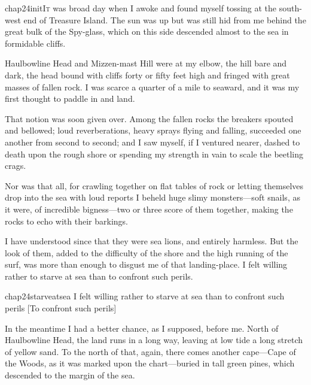 
\lettrine[lines=5,image=true,findent=2pt]{chap24initI}{t} was broad day when I awoke and found myself tossing at the south-west end of Treasure Island. The sun was up but was still hid from me behind the great bulk of the Spy-glass, which on this side descended almost to the sea in formidable cliffs.

Haulbowline Head and Mizzen-mast Hill were at my elbow, the hill bare and dark, the head bound with cliffs forty or fifty feet high and fringed with great masses of fallen rock. I was scarce a quarter of a mile to seaward, and it was my first thought to paddle in and land.

That notion was soon given over. Among the fallen rocks the breakers spouted and bellowed; loud reverberations, heavy sprays flying and falling, succeeded one another from second to second; and I saw myself, if I ventured nearer, dashed to death upon the rough shore or spending my strength in vain to scale the beetling crags.

Nor was that all, for crawling together on flat tables of rock or letting themselves drop into the sea with loud reports I beheld huge slimy monsters—soft snails, as it were, of incredible bigness—two or three score of them together, making the rocks to echo with their barkings.

I have understood since that they were sea lions, and entirely harmless. But the look of them, added to the difficulty of the shore and the high running of the surf, was more than enough to disgust me of that landing-place. I felt willing rather to starve at sea than to confront such perils.


\begin{bwbigpic}
	[\picsize]
	{chap24starveatsea}
	{I felt willing rather to starve at sea than to confront such perils}
	[To confront such perils]
\end{bwbigpic}

In the meantime I had a better chance, as I supposed, before me. North of Haulbowline Head, the land runs in a long way, leaving at low tide a long stretch of yellow sand. To the north of that, again, there comes another cape—Cape of the Woods, as it was marked upon the chart—buried in tall green pines, which descended to the margin of the sea.

